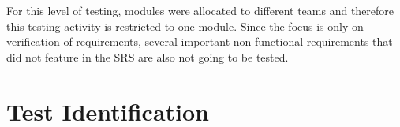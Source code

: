 For this level of testing, modules were allocated to different teams and therefore this testing activity is restricted to one module. Since the focus is only on verification of requirements, several important non-functional requirements that did not feature in the SRS are also not going to be tested.

\section{Test Identification}
%
